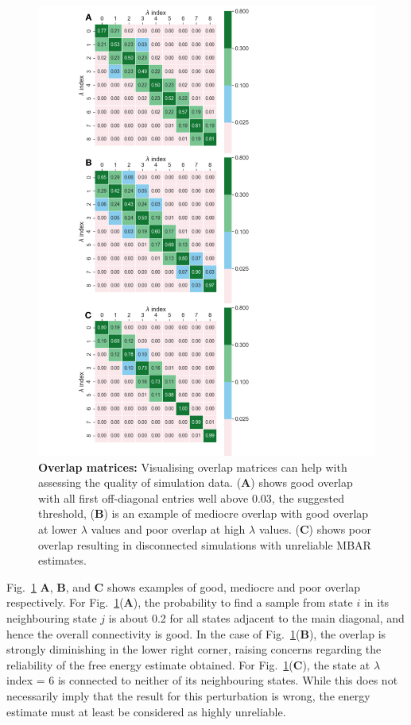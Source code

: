 \documentclass[9pt,bestpractices]{livecoms}
\begin{document}
\begin{figure}[ht!]
\includegraphics[width=0.90\columnwidth]{figures/fig12_overlap/Figure.pdf}
\caption{\label{fig:overlap} \textbf{Overlap matrices:} Visualising overlap matrices can help with assessing the quality of simulation data. (\textbf{A}) shows good overlap with all first off-diagonal entries well above 0.03, the suggested threshold, (\textbf{B}) is an example of mediocre overlap with good overlap at lower $\lambda$ values and poor overlap at high $\lambda$ values. (\textbf{C}) shows poor overlap resulting in disconnected simulations with unreliable MBAR estimates.}
\end{figure}
%
Fig.~\ref{fig:overlap} \textbf{A}, \textbf{B}, and \textbf{C} shows examples of good, mediocre and poor overlap respectively. For Fig.~\ref{fig:overlap}(\textbf{A}), the probability to find a sample from state $i$ in its neighbouring state $j$ is about 0.2 for all states adjacent to the main diagonal, and hence the overall connectivity is good. In the case of Fig.~\ref{fig:overlap}(\textbf{B}), the overlap is strongly diminishing in the lower right corner, raising concerns regarding the reliability of the free energy estimate obtained. For Fig.~\ref{fig:overlap}(\textbf{C}), the state at $\lambda$ index = 6 is connected to neither of its neighbouring states. While this does not necessarily imply that the result for this perturbation is wrong, the energy estimate must at least be considered as highly unreliable.
\end{document}
